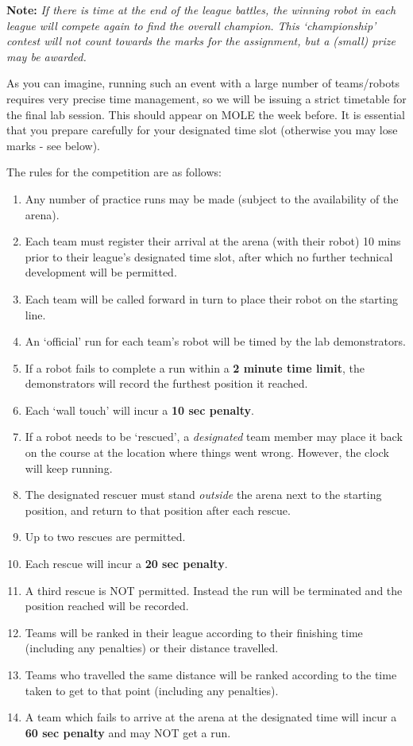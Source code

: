 \documentclass[hidelinks,a4paper,11pt]{article}
\begin{document}
	{\bfseries Note:}  \emph{If there is time at the end of the league battles, the winning robot in each league will compete again to find the overall champion.  This `championship' contest will not count towards the marks for the assignment, but a (small) prize may be awarded.}
	
	As you can imagine, running such an event with a large number of teams/robots requires very precise time management, so we will be issuing a strict timetable for the final lab session.  This should appear on MOLE the week before.  It is essential that you prepare carefully for your designated time slot (otherwise you may lose marks - see below).
	
	The rules for the competition are as follows:
	\begin{enumerate}
		\item Any number of practice runs may be made (subject to the availability of the arena).
		\item Each team must register their arrival at the arena (with their robot) 10 mins prior to their league's designated time slot, after which no further technical development will be permitted.
		\item Each team will be called forward in turn to place their robot on the starting line.
		\item An `official' run for each team's robot will be timed by the lab demonstrators.
		\item If a robot fails to complete a run within a \textbf{2 minute time limit}, the demonstrators will record the furthest position it reached.
		\item Each `wall touch' will incur a \textbf{10 sec penalty}.
		\item If a robot needs to be `rescued', a \emph{designated} team member may place it back on the course at the location where things went wrong.  However, the clock will keep running.
		\item The designated rescuer must stand \emph{outside} the arena next to the starting position, and return to that position after each rescue.
		\item Up to two rescues are permitted.
		\item Each rescue will incur a \textbf{20 sec penalty}.
		\item A third rescue is NOT permitted.  Instead the run will be terminated and the position reached will be recorded.
		\item Teams will be ranked in their league according to their finishing time (including any penalties) or their distance travelled.
		\item Teams who travelled the same distance will be ranked according to the time taken to get to that point (including any penalties).
		\item A team which fails to arrive at the arena at the designated time will incur a \textbf{60 sec penalty} and may NOT get a run.
	\end{enumerate}
	
\end{document}
